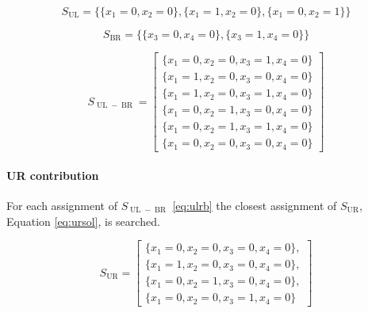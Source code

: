 \begin{equation}
    S_{\operatorname{UL}} =\{\{x_1=0,x_2=0\}, \{x_1=1,x_2=0\}, \{x_1=0,x_2=1\}\}
    \label{eq:s_ul}
\end{equation}

\begin{equation}
    S_{\operatorname{BR}} =\{\{x_3=0,x_4=0\}, \{x_3=1,x_4=0\}\}
    \label{eq:s_br}
\end{equation}

\begin{equation}
    S_{\operatorname{UL}-\operatorname{BR}}=\left[
    \begin{array}{c}
        \{x_1=0,x_2=0,x_3=1,x_4=0\} \\
        \{x_1=1,x_2=0,x_3=0,x_4=0\} \\
        \{x_1=1,x_2=0,x_3=1,x_4=0\} \\
        \{x_1=0,x_2=1,x_3=0,x_4=0\} \\
        \{x_1=0,x_2=1,x_3=1,x_4=0\} \\
        \{x_1=0,x_2=0,x_3=0,x_4=0\}
    \end{array}
    \right]
    \label{eq:ulrb}
\end{equation}

\paragraph{UR contribution} For each assignment of $S_{\operatorname{UL}-\operatorname{BR}}$ \eqref{eq:ulrb} the closest assignment of $S_{\operatorname{UR}}$, Equation \eqref{eq:ursol}, is searched.

\begin{equation}
    S_{\operatorname{UR}}=\left[
        \begin{array}{c}
            \{x_1=0,x_2=0,x_3=0,x_4=0\},\\ 
            \{x_1=1,x_2=0,x_3=0,x_4=0\},\\
            \{x_1=0,x_2=1,x_3=0,x_4=0\},\\
            \{x_1=0,x_2=0,x_3=1,x_4=0\}
        \end{array}
        \right]
        \label{eq:ursol}
\end{equation}

